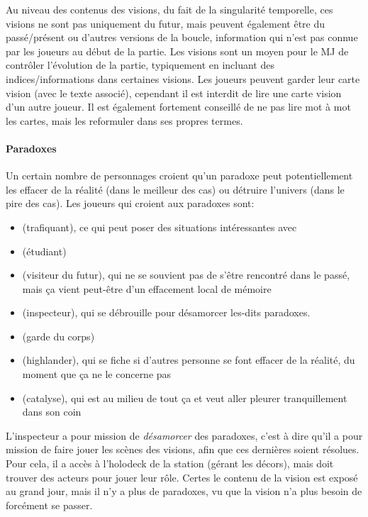 {	\par Au niveau des contenus des visions, du fait de la singularité temporelle, ces visions ne sont pas uniquement du futur, mais peuvent également être du passé/présent ou d'autres versions de la boucle, information qui n'est pas connue par les joueurs au début de la partie. Les visions sont un moyen pour le MJ de contrôler l'évolution de la partie, typiquement en incluant des indices/informations dans certaines visions. Les joueurs peuvent garder leur carte vision (avec le texte associé), cependant il est interdit de lire une carte vision d'un autre joueur. Il est également fortement conseillé de ne pas lire mot à mot les cartes, mais les reformuler dans ses propres termes.
	
	
	\paragraph{Paradoxes} Un certain nombre de personnages croient qu'un paradoxe peut potentiellement les effacer de la réalité (dans le meilleur des cas) ou détruire l'univers (dans le pire des cas). Les joueurs qui croient aux paradoxes sont:
	\begin{itemize}
		\item \nmPlayerII (trafiquant), ce qui peut poser des situations intéressantes avec \nmPlayerIII
		\item \nmPlayerIII (étudiant)
		\item \nmPlayerV (visiteur du futur), qui ne se souvient pas de s'être rencontré dans le passé, mais ça vient peut-être d'un effacement local de mémoire
		\item \nmPlayerVII (inspecteur), qui se débrouille pour désamorcer les-dits paradoxes.
		\item \nmPlayerVIII (garde du corps)
		\item \nmPlayerX (highlander), qui se fiche si d'autres personne se font effacer de la réalité, du moment que ça ne le concerne pas
		\item \nmPlayerXI (catalyse), qui est au milieu de tout ça et veut aller pleurer tranquillement dans son coin
	\end{itemize}
	
	\par L'inspecteur a pour mission de \emph{désamorcer} des paradoxes, c'est à dire qu'il a pour mission de faire jouer les scènes des visions, afin que ces dernières soient résolues. Pour cela, il a accès à l'holodeck de la station (gérant les décors), mais doit trouver des acteurs pour jouer leur rôle. Certes le contenu de la vision est exposé au grand jour, mais il n'y a plus de paradoxes, vu que la vision n'a plus besoin de forcément se passer.
	
}
